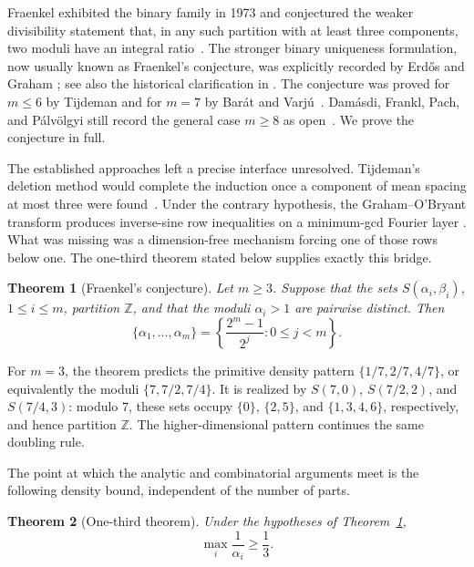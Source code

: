 \documentclass[11pt]{article}
\newtheorem{theorem}{Theorem}[section]
\theoremstyle{definition}
\theoremstyle{remark}
\newcommand{\Z}{\mathbb Z}
\begin{document}
Fraenkel exhibited the binary family in 1973 and conjectured the weaker
divisibility statement that, in any such partition with at least three
components, two moduli have an integral ratio~\cite{Fraenkel1973}.
The stronger binary uniqueness formulation, now usually known as
Fraenkel's conjecture, was explicitly recorded by Erd\H{o}s and Graham
\cite[p.~19]{ErdosGraham1980}; see also the historical clarification in
\cite[Conjecture~1.4 and footnote~1]{DamasdiEtAl2026}.
The conjecture was proved for \(m\le6\) by Tijdeman and for \(m=7\)
by Bar\'at and Varj\'u~\cite{Tijdeman2000,BaratVarju2003}.
Dam\'asdi, Frankl, Pach, and P\'alv\"olgyi still record the general case
\(m\ge8\) as open~\cite[Conjecture~1.4 and the following paragraph]{DamasdiEtAl2026}.
We prove the conjecture in full.

The established approaches left a precise interface unresolved.  Tijdeman's
deletion method would complete the induction once a component of mean spacing
at most three were found~\cite[Remark~5, p.~479]{TijdemanBalanced2000}.
Under the contrary hypothesis, the Graham--O'Bryant transform produces
inverse-sine row inequalities on a minimum-gcd Fourier layer
\cite[Theorem~1.1 and Section~4.2]{GrahamOBryant2005}.  What was missing was
a dimension-free mechanism forcing one of those rows below one.  The
one-third theorem stated below supplies exactly this bridge.

\begin{theorem}[Fraenkel's conjecture]\label{thm:main}
Let \(m\ge3\).  Suppose that the sets
\(S(\alpha_i,\beta_i)\), \(1\le i\le m\), partition \(\Z\), and that
the moduli \(\alpha_i>1\) are pairwise distinct.  Then
\[
 \{\alpha_1,\ldots,\alpha_m\}
 =\left\{\frac{2^m-1}{2^j}:0\le j<m\right\}.
\]
\end{theorem}

For \(m=3\), the theorem predicts the primitive density pattern
\(\{1/7,2/7,4/7\}\), or equivalently the moduli
\(\{7,7/2,7/4\}\).  It is realized by
\(S(7,0)\), \(S(7/2,2)\), and \(S(7/4,3)\): modulo \(7\), these sets occupy
\(\{0\}\), \(\{2,5\}\), and \(\{1,3,4,6\}\), respectively, and hence
partition \(\Z\).  The higher-dimensional pattern continues the same
doubling rule.

The point at which the analytic and combinatorial arguments meet is the
following density bound, independent of the number of parts.

\begin{theorem}[One-third theorem]\label{thm:one-third-main}
Under the hypotheses of Theorem~\ref{thm:main},
\[
 \max_i\frac1{\alpha_i}\ge\frac13.
\]
\end{theorem}
\end{document}
